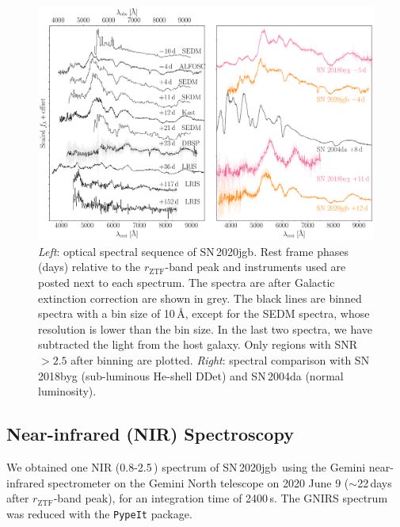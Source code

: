 \documentclass[twocolumn]{aastex631}
\newcommand{\sn}{SN\,2020jgb}
\begin{document}

\begin{figure}
    \centering
    \includegraphics[width=\textwidth]{optical_spec_evolution.pdf}
    \caption{\textit{Left}: optical spectral sequence of \sn. Rest frame phases (days) relative to the $r_\mathrm{ZTF}$-band peak and instruments used are posted next to each spectrum. The spectra are after Galactic extinction correction are shown in grey. The black lines are binned spectra with a bin size of 10\,\r{A}, except for the SEDM spectra, whose resolution is lower than the bin size. In the last two spectra, we have subtracted the light from the host galaxy. Only regions with SNR $>2.5$ after binning are plotted. 
    \textit{Right}: spectral comparison with SN\,2018byg (sub-luminous He-shell DDet) and SN\,2004da (normal luminosity).} %
    \label{fig:spec_evo}
\end{figure}

\subsection{Near-infrared (NIR) Spectroscopy}
We obtained one NIR (0.8-2.5\,\micron) spectrum of \sn\ using the Gemini near-infrared spectrometer \citep[GNIRS;][]{GNIRS1998} on the Gemini North telescope on 2020 June 9 ($\sim$22\,days after $r_\mathrm{ZTF}$-band peak), for an integration time of 2400\,s. The GNIRS spectrum was reduced with the \texttt{PypeIt} package.
\end{document}
